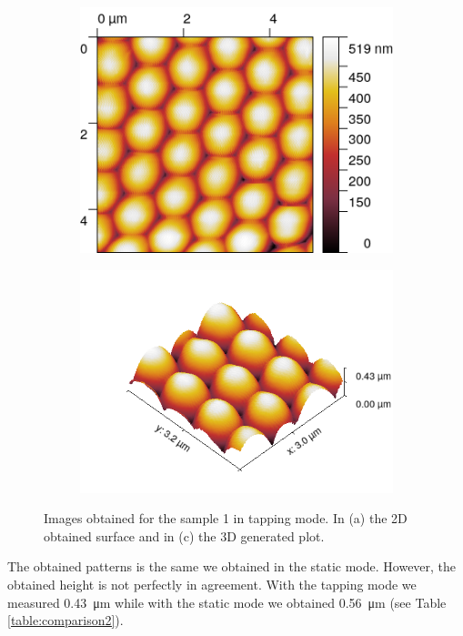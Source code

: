 \documentclass[11pt,a4paper]{article}
\begin{document}
\begin{figure}[H]
\centering
\begin{subfigure}[b]{0.45\textwidth}
\includegraphics[width=\textwidth]{tm_sample1}
\caption{}
\end{subfigure}
\begin{subfigure}[b]{0.45\textwidth}
\includegraphics[width=\textwidth]{tm_sample1_3D}
\caption{}
\end{subfigure}
\caption{Images obtained for the sample 1 in tapping mode. In (a) the 2D obtained surface and in (c) the 3D generated plot.}
\label{fig:tapping_sample1}
\end{figure}

The obtained patterns is the same we obtained in the static mode. However, the obtained height is not perfectly in agreement. With the tapping mode we measured \SI{0.43}{\micro\m} while with the static mode we obtained \SI{0.56}{\micro\m} (see Table \ref{table:comparison2}).
\end{document}
